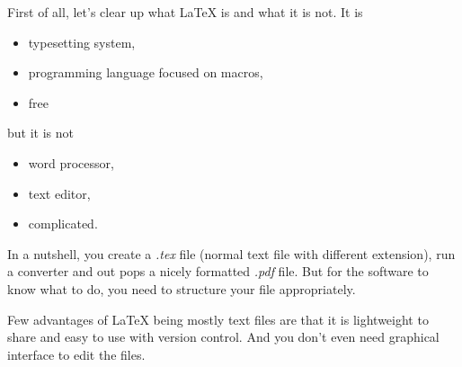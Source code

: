 First of all, let's clear up what LaTeX is and what it is not. It is

\begin{itemize}
  \item typesetting system,
  \item programming language focused on macros,
  \item free
\end{itemize}

but it is not

\begin{itemize}
  \item word processor,
  \item text editor,
  \item complicated.
\end{itemize}

In a nutshell, you create a \textit{.tex} file (normal text file with different extension), run a converter and out pops a nicely formatted \textit{.pdf} file. But for the software to know what to do, you need to structure your file appropriately.

Few advantages of LaTeX being mostly text files are that it is lightweight to share and easy to use with version control. And you don't even need graphical interface to edit the files.
